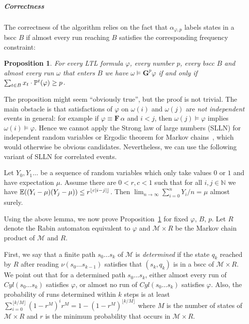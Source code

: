 \documentclass[a4paper,UKenglish]{lipics}
\newcommand{\cyl}{\mathit{Cyl}}
\newcommand{\mc}{\mathcal{M}}
\newcommand{\Gf}[1]{\mathbf{G}^{#1}}
\newcommand{\F}{\mathbf{F}\,}
\newcommand{\E}[2][]{\ifblank{#1}{\mathbb{E}(#2)}{\mathbb{E}^{#1}(#2)}}
\renewcommand{\P}[2][]{\ifblank{#1}{\mathbb{P}(#2)}{\mathbb{P}^{#1}(#2)}}
\newcommand{\ssf}[1]{x_{#1}}
\newcommand{\rabin}{R}
\newcommand{\Nset}{\mathbb{N}}
\newtheorem{proposition}[theorem]{\bfseries  Proposition}
\begin{document}
\subparagraph{Correctness}
The correctness of the algorithm relies on the fact that $\alpha_{\varphi,p}$ labels states in a bscc $B$ if almost every run reaching $B$ satisfies the corresponding frequency constraint:

\begin{proposition}\label{prop:mc-replace}
	For every LTL formula $\varphi$, every number $p$, every bscc $B$ and almost every run $\omega$ that enters $B$ we have
	$\omega \models \Gf{p}{\varphi}$ if and only if $\sum_{t\in B} \ssf{t}\cdot \P[t]{\varphi} \ge p$.
\end{proposition}

The proposition might seem ``obviously true'', but the proof is not trivial.
The main obstacle is that satisfactions of $\varphi$ on $\omega(i)$ and $\omega(j)$
are {\em not independent} events in general: for example if $\varphi \equiv \F \alpha$ and $i<j$, then $\omega(j)\models \varphi$ implies
$\omega(i)\models \varphi$. Hence we cannot apply the Strong law of large numbers (SLLN) for independent random variables or
Ergodic theorem for Markov chains~\cite[Theorems 1.10.1-2]{Norris}, which would otherwise be obvious candidates.
Nevertheless, we can use the following variant of SLLN for correlated events.
\begin{lemma}\label{lemma:alt-slln}
	Let $Y_0,Y_1\ldots$ be a sequence of random variables which only take values $0$ or $1$ and have expectation $\mu$. Assume there are $0<r,c<1$ such that for all $i,j\in \Nset$ we have $\E{(Y_i-\mu)(Y_j - \mu)} \le r^{\lfloor c |i-j|\rfloor}$. Then
	$\lim_{n\rightarrow \infty} \sum_{i=0}^n Y_i / n = \mu$ almost surely.
\end{lemma}

Using the above lemma, we now prove Proposition~\ref{prop:mc-replace} for fixed $\varphi$, $B$, $p$. Let $\rabin$ denote the Rabin automaton equivalent to $\varphi$ and $\mc \times \rabin$ be the Markov chain product of $\mc$ and $\rabin$. 

First, we say that a finite path $s_0\ldots s_k$ of $\mc$ is \emph{determined} if the state $q_k$ reached by $R$ after reading $\nu(s_0 \ldots s_{k-1})$ satisfies that $(s_k,q_k)$ is in a bscc of $\mc \times \rabin$.
We point out that for a determined path $s_0\ldots s_k$, either almost every run of $\cyl(s_0\ldots s_k)$ satisfies $\varphi$, or almost no run of $\cyl(s_0\ldots s_k)$ satisfies $\varphi$.
Also, the probability of runs determined within $k$ steps is at least
$\sum_{i=0}^{\lfloor k/M\rfloor} (1-r^M)^{i} r^M = 1-(1-r^M)^{\lfloor k/M\rfloor}$ where $M$ is the number of states of $\mc \times \rabin$ and $r$ is the minimum probability that occurs in $\mc \times \rabin$.
\end{document}

